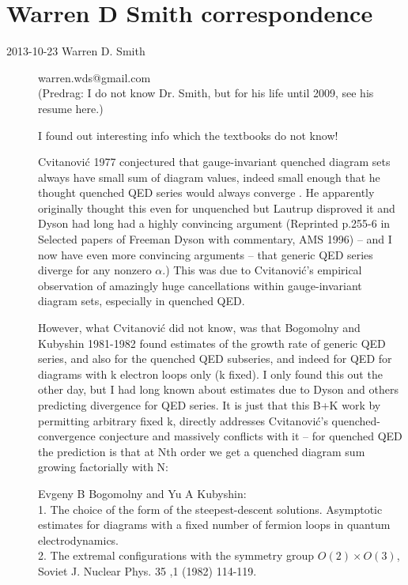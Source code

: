 
\chapter{Warren D Smith correspondence}
\label{c-WDSmith}

\begin{description}

\item[2013-10-23  Warren D. Smith] warren.wds@gmail.com
\\
(Predrag: I do not know
Dr. Smith, but for his life until 2009, see his resume
{here}.)

I found out interesting info which the textbooks do not know!

Cvitanovi\'c 1977 conjectured that gauge-invariant quenched diagram sets
always have small sum of diagram values, indeed small enough that he
thought quenched QED series
would always converge
    .
He apparently originally thought this even
for unquenched but Lautrup disproved it and Dyson had long had a
highly convincing argument (Reprinted p.255-6 in Selected papers
of Freeman Dyson with
commentary, AMS 1996)
-- and I now have even more convincing
arguments -- that generic QED series diverge for any nonzero $\alpha$.)
This was due to Cvitanovi\'c's empirical observation of amazingly huge
cancellations within gauge-invariant diagram sets, especially in
quenched QED.

However, what Cvitanovi\'c did not know, was that
{Bogomolny} and Kubyshin 1981-1982
found estimates of the growth rate of generic QED series, and also for the
quenched QED subseries,
and indeed for QED for diagrams with k electron loops only (k fixed).
I only found this out the other day, but I had long known about
estimates due to Dyson and others predicting divergence for QED
series.  It is just that this B+K work by permitting arbitrary fixed
k, directly addresses Cvitanovi\'c's quenched-convergence conjecture and
massively conflicts with it -- for quenched QED the prediction is that
at Nth order we get a quenched diagram sum growing factorially with N:

Evgeny B Bogomolny and Yu A Kubyshin:
\\
1. The choice of the form of the
steepest-descent solutions.
Asymptotic estimates for diagrams with a fixed number of fermion loops
in quantum electrodynamics.
\\
2. The extremal configurations with the
symmetry group $O(2)\times O(3)$,
Soviet J. Nuclear Phys. 35 ,1 (1982) 114-119.


\end{description}
